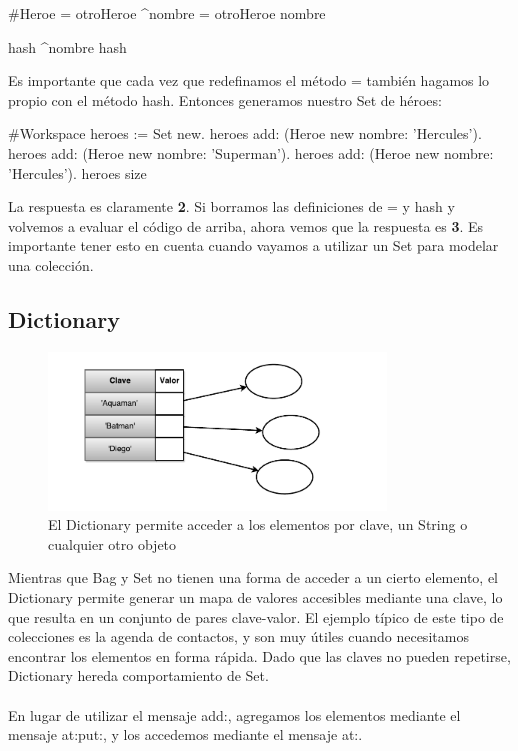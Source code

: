 \documentclass[a4paper,12pt]{book}
\begin{document}
\begin{code}
#Heroe
= otroHeroe
    ^nombre = otroHeroe nombre
    
hash
    ^nombre hash
\end{code}

Es importante que cada vez que redefinamos el método = también hagamos lo propio con el método hash.
Entonces generamos nuestro Set de héroes:

\begin{code}
#Workspace
heroes := Set new.
heroes add: (Heroe new nombre: 'Hercules').
heroes add: (Heroe new nombre: 'Superman').
heroes add: (Heroe new nombre: 'Hercules').
heroes size
\end{code}

La respuesta es claramente \textbf{2}. Si borramos las definiciones de = y hash y volvemos a evaluar 
el código de arriba, ahora vemos que la respuesta es \textbf{3}. Es importante tener esto en cuenta cuando
vayamos a utilizar un Set para modelar una colección.

\subsection{Dictionary}

\begin{figure}[h!]
    \centering
    \includegraphics[width=0.8\textwidth]{images/40_Dictionary.pdf}
    \caption{El Dictionary permite acceder a los elementos por clave, un String o cualquier otro objeto}
\end{figure}
\FloatBarrier

Mientras que Bag y Set no tienen una forma de acceder a un cierto elemento, el Dictionary permite generar un
mapa de valores accesibles mediante una clave, lo que resulta en un conjunto de pares clave-valor. El ejemplo
típico de este tipo de colecciones es la agenda de contactos, y son muy útiles cuando necesitamos
encontrar los elementos en forma rápida. Dado que las claves no pueden repetirse, Dictionary hereda
comportamiento de Set. 
\\
\\
En lugar de utilizar el mensaje add:, agregamos los elementos mediante el mensaje at:put:, y los accedemos
mediante el mensaje at:.
\end{document}
